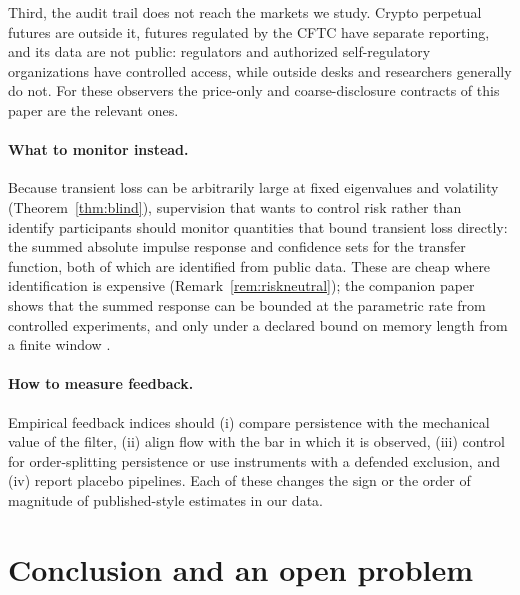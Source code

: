 \documentclass[12pt]{article}
\theoremstyle{definition}
\theoremstyle{remark}
\begin{document}
Third, the audit trail does not reach the markets we study. Crypto perpetual futures are outside it, futures regulated by the CFTC have separate reporting, and its data are not public: regulators and authorized self-regulatory organizations have controlled access, while outside desks and researchers generally do not. For these observers the price-only and coarse-disclosure contracts of this paper are the relevant ones.

\paragraph{What to monitor instead.} Because transient loss can be arbitrarily large at fixed eigenvalues and volatility (Theorem~\ref{thm:blind}), supervision that wants to control risk rather than identify participants should monitor quantities that bound transient loss directly: the summed absolute impulse response and confidence sets for the transfer function, both of which are identified from public data. These are cheap where identification is expensive (Remark~\ref{rem:riskneutral}); the companion paper shows that the summed response can be bounded at the parametric rate from controlled experiments, and only under a declared bound on memory length from a finite window \citep{niroula2026b}.

\paragraph{How to measure feedback.} Empirical feedback indices should (i) compare persistence with the mechanical value of the filter, (ii) align flow with the bar in which it is observed, (iii) control for order-splitting persistence or use instruments with a defended exclusion, and (iv) report placebo pipelines. Each of these changes the sign or the order of magnitude of published-style estimates in our data.

\section{Conclusion and an open problem}\label{sec:conclusion}
\end{document}
